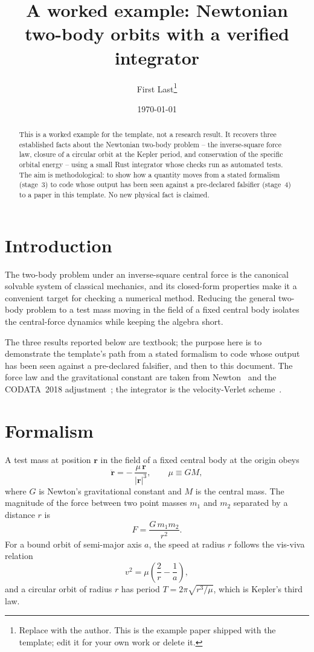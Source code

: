 \documentclass[11pt]{article}
\title{A worked example: Newtonian two-body orbits with a verified integrator}
\author{First Last\thanks{Replace with the author. This is the example paper
shipped with the template; edit it for your own work or delete it.}}
\date{\today}
\begin{document}
\maketitle

\begin{abstract}
This is a worked example for the template, not a research result. It recovers
three established facts about the Newtonian two-body problem -- the
inverse-square force law, closure of a circular orbit at the Kepler period,
and conservation of the specific orbital energy -- using a small Rust
integrator whose checks run as automated tests. The aim is methodological: to
show how a quantity moves from a stated formalism (stage~3) to code whose
output has been seen against a pre-declared falsifier (stage~4) to a paper in
this template. No new physical fact is claimed.
\end{abstract}

\section{Introduction}

The two-body problem under an inverse-square central force is the canonical
solvable system of classical mechanics, and its closed-form properties make it
a convenient target for checking a numerical method. Reducing the general
two-body problem to a test mass moving in the field of a fixed central body
isolates the central-force dynamics while keeping the algebra short.

The three results reported below are textbook; the purpose here is to
demonstrate the template's path from a stated formalism to code whose output
has been seen against a pre-declared falsifier, and then to this document. The
force law and the gravitational constant are taken from
Newton~\citep{Newton1687} and the CODATA~2018 adjustment~\citep{CODATA2018};
the integrator is the velocity-Verlet scheme~\citep{Swope1982}.

\section{Formalism}
\label{sec:formalism}

A test mass at position $\mathbf{r}$ in the field of a fixed central body at
the origin obeys
\begin{equation}
  \ddot{\mathbf{r}} = -\,\frac{\mu\,\mathbf{r}}{\lvert \mathbf{r} \rvert^{3}},
  \qquad \mu \equiv G M,
  \label{eqn:eom}
\end{equation}
where $G$ is Newton's gravitational constant and $M$ is the central mass. The
magnitude of the force between two point masses $m_1$ and $m_2$ separated by a
distance $r$ is
\begin{equation}
  F = \frac{G\,m_1 m_2}{r^{2}}.
  \label{eqn:force}
\end{equation}
For a bound orbit of semi-major axis $a$, the speed at radius $r$ follows the
vis-viva relation
\begin{equation}
  v^{2} = \mu\!\left(\frac{2}{r} - \frac{1}{a}\right),
  \label{eqn:visviva}
\end{equation}
and a circular orbit of radius $r$ has period $T = 2\pi\sqrt{r^{3}/\mu}$,
which is Kepler's third law.
\end{document}

